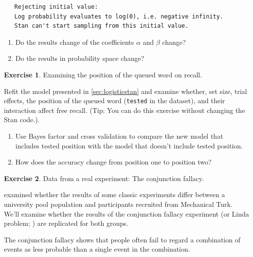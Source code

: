 \documentclass[12pt,]{krantz}
\providecommand{\tightlist}{%
  \setlength{\itemsep}{0pt}\setlength{\parskip}{0pt}}
\theoremstyle{definition}
\theoremstyle{definition}
\theoremstyle{definition}
\newtheorem{exercise}{Exercise}[chapter]
\theoremstyle{remark}
\begin{document}
\begin{verbatim}
   Rejecting initial value:
   Log probability evaluates to log(0), i.e. negative infinity.
   Stan can't start sampling from this initial value.
\end{verbatim}

\begin{enumerate}
\def\labelenumi{\alph{enumi}.}
\tightlist
\item
  Do the results change of the coefficients \(\alpha\) and \(\beta\) change?
\item
  Do the results in probability space change?
\end{enumerate}

\begin{exercise}
\protect\hypertarget{exr:logisticstan}{}{\label{exr:logisticstan} }Examining the position of the queued word on recall.
\end{exercise}

Refit the model presented in \ref{sec:logisticstan} and examine whether, set size, trial effects, the position of the queued word (\texttt{tested} in the dataset), and their interaction affect free recall. (Tip: You can do this exercise without changing the Stan code.).

\begin{enumerate}
\def\labelenumi{\alph{enumi}.}
\tightlist
\item
  Use Bayes factor and cross validation to compare the new model that includes tested position with the model that doesn't include tested position.
\item
  How does the accuracy change from position one to position two?
\end{enumerate}

\begin{exercise}
\protect\hypertarget{exr:fallacy}{}{\label{exr:fallacy} }Data from a real experiment: The conjunction fallacy.
\end{exercise}

\citet{Paolaccietal} examined whether the results of some classic experiments differ between a university pool population and participants recruited from Mechanical Turk. We'll examine whether the results of the conjunction fallacy experiment (or Linda problem; \citet{TverskyKahneman1983}) are replicated for both groups.

The conjunction fallacy shows that people often fail to regard a combination of events as less probable than a single event in the combination. \citet{TverskyKahneman1983}
\end{document}

